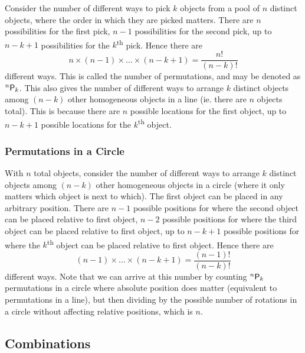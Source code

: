 \documentclass[11pt]{report} %
\begin{document}
Consider the number of different ways to pick $k$ objects from a pool of $n$ distinct objects, where the order in which they are picked matters. There are $n$ possibilities for the first pick, $n - 1$ possibilities for the second pick, up to $n - k + 1$ possibilities for the $k$\textsuperscript{th} pick. Hence there are
\begin{equation}
n\times\left(n - 1\right)\times \dots\times \left(n - k + 1\right) = \dfrac{n!}{\left(n - k\right)!}
\end{equation}
different ways. This is called the number of permutations, and may be denoted as $\mathstrut^{n}\mathsf{P}_{k}$. This also gives the number of different ways to arrange $k$ distinct objects among $\left(n - k\right)$ other homogeneous objects in a line (ie. there are $n$ objects total). This is because there are $n$ possible locations for the first object, up to $n - k + 1$ possible locations for the $k$\textsuperscript{th} object.

\subsubsection{Permutations in a Circle}

With $n$ total objects, consider the number of different ways to arrange $k$ distinct objects among $\left(n - k\right)$ other homogeneous objects in a circle (where it only matters which object is next to which). The first object can be placed in any arbitrary position. There are $n - 1$ possible positions for where the second object can be placed relative to first object, $n - 2$ possible positions for where the third object can be placed relative to first object, up to $n - k + 1$ possible positions for where the $k$\textsuperscript{th} object can be placed relative to first object. Hence there are
\begin{equation}
\left(n - 1\right)\times \dots\times \left(n - k + 1\right) = \dfrac{\left(n - 1\right)!}{\left(n - k\right)!}
\end{equation}
different ways. Note that we can arrive at this number by counting $\mathstrut^{n}\mathsf{P}_{k}$ permutations in a circle where absolute position 
does matter (equivalent to permutations in a line), but then dividing by the possible number of rotations in a circle without affecting relative positions, which is $n$.

\subsection{Combinations}
\end{document}
